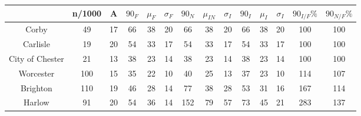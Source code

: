 \begin{tabular}{c|ccccccccccccc}
& n/1000 & A & $90_{F}$ & $\mu_{F}$ & $\sigma_{F}$ & $90_{N}$ & $\mu_{IN}$ & $\sigma_{I}$ & $90_{I}$ & $\mu_{I}$ & $\sigma_{I}$ & $90_{I/F}\%$ & $90_{N/F}\%$ \\
\hline
Corby & 49 & 17 & 66 & 38 & 20 & 66 & 38 & 20 & 66 & 38 & 20 & 100 & 100 \\
Carlisle & 19 & 20 & 54 & 33 & 17 & 54 & 33 & 17 & 54 & 33 & 17 & 100 & 100 \\
City of Chester & 21 & 13 & 38 & 23 & 14 & 38 & 23 & 14 & 38 & 23 & 14 & 100 & 100 \\
Worcester & 100 & 15 & 35 & 22 & 10 & 40 & 25 & 13 & 37 & 23 & 10 & 114 & 107 \\
Brighton & 110 & 19 & 46 & 28 & 14 & 77 & 38 & 28 & 53 & 31 & 16 & 167 & 114 \\
Harlow & 91 & 20 & 54 & 36 & 14 & 152 & 79 & 57 & 73 & 45 & 21 & 283 & 137 \\
\end{tabular}
